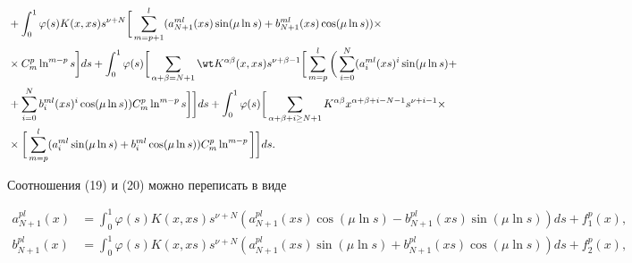\begin{align}
%


&+\int^1_0\varphi(s)K(x,xs)s^{\nu+N}\bigg[\sum^l_{m=p+1} 


(a^{ml}_{N+1}(xs)\sin(\mu\ln s)+b^{ml}_{N+1}(xs) 


\cos(\mu\ln s))\times\notag \\ 


% 


&\times C^p_m\ln^{m-p}s\bigg]ds+\int^1_0\varphi(s)\bigg[ 


\sum_{\alpha+\beta=N+1}\wt K^{\alpha\beta}(x,xs)s^{\nu+\beta-1} 


\bigg[\sum^l_{m=p}\bigg(\sum^N_{i=0}(a^{ml}_i(xs)^i 


\sin(\mu\ln s)+\notag \\ 


% 


&+\sum^N_{i=0}b^{ml}_i(xs)^i\cos(\mu\ln s))C^p_m 


\ln^{m-p}s\bigg]\bigg]ds+\int^1_0\varphi(s)\bigg[ 


\sum_{\alpha+\beta+i\ge N+1}K^{\alpha\beta} 


x^{\alpha+\beta+i-N-1}s^{\nu+i-1}\times\notag \\ 


% 


&\times\bigg[\sum^l_{m=p}(a^{ml}_i\sin(\mu\ln s)+ 


b^{ml}_i\cos(\mu\ln s)) C^p_m\ln^{m-p}\bigg]\bigg]ds.\notag 


\end{align} 


 


Соотношения (19) и (20) можно переписать в виде 


\begin{equation} 


\begin{split} 


a^{pl}_{N+1}(x)&=\int^1_0\varphi(s)K(x,xs)s^{\nu+N} 


(a^{pl}_{N+1}(xs)\cos(\mu\ln s)-b^{pl}_{N+1}(xs) 


\sin(\mu\ln s))ds+f^p_1(x),\\ 


% 


b^{pl}_{N+1}(x)&=\int^1_0\varphi(s)K(x,xs)s^{\nu+N} 


(a^{pl}_{N+1}(xs)\sin(\mu\ln s)+b^{pl}_{N+1}(xs) 


\cos(\mu\ln s))ds+f^p_2(x), 


\end{split} 


\end{equation} 


